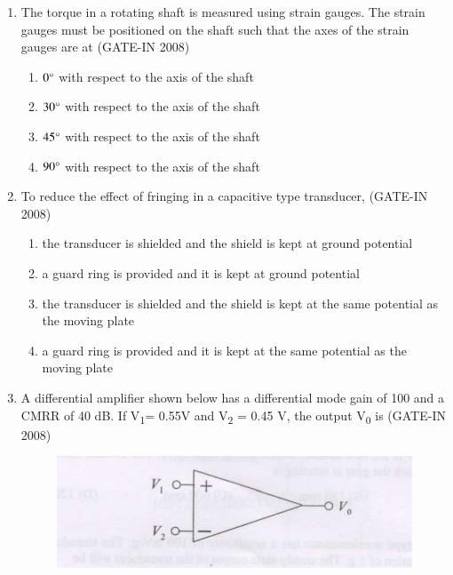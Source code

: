 \documentclass[journal,12pt,onecolumn]{IEEEtran}
\theoremstyle{remark}
\begin{document}
\begin{enumerate}
    \item The torque in a rotating shaft is measured using strain gauges. The strain gauges must be positioned
on the shaft such that the axes of the strain gauges are at \hfill (GATE-IN 2008)
\begin{multicols}{2}
    \begin{enumerate} 
        \item  $0\degree$ with respect to the axis of the shaft 
        \item  $30\degree$ with respect to the axis of the shaft
        \item  $45\degree$ with respect to the axis of the shaft
        \item  $90\degree$ with respect to the axis of the shaft
    \end{enumerate}
    \end{multicols}
    
    \item To reduce the effect of fringing in a capacitive type transducer, \hfill (GATE-IN 2008)
    \begin{enumerate} 
        \item  the transducer is shielded and the shield is kept at ground potential  
        \item  a guard ring is provided and it is kept at ground potential  
        \item   the transducer is shielded and the shield is kept at the same potential as the moving plate
        \item a guard ring is provided and it is kept at the same potential as the moving plate
    \end{enumerate}

    \item A differential amplifier shown below has a differential mode gain of 100 and a CMRR of 40 dB. If V\textsubscript{1}= 0.55V  and V\textsubscript{2} = 0.45 V, the output V\textsubscript{0} is \hfill (GATE-IN 2008)

 \begin{figure}[H]
    \centering
    \includegraphics[width=0.5\columnwidth]{figs/i18.jpg}
    \caption{}
    \label{fig:placeholder18}
\end{figure}


\end{enumerate}
\end{document}
